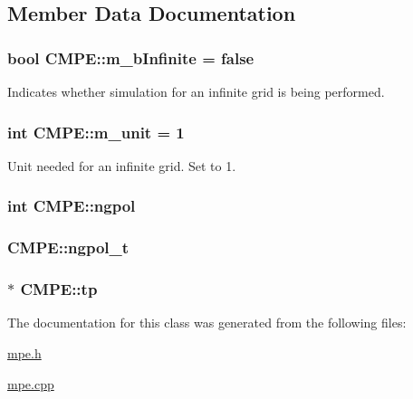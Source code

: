 \subsection{Member Data Documentation}
\hypertarget{classCMPE_a1c612f996b0be31759020f287d3ee7cc}{
\subsubsection[{m\-\_\-b\-Infinite}]{\setlength{\rightskip}{0pt plus 5cm}bool C\-M\-P\-E\-::m\-\_\-b\-Infinite = false\hspace{0.3cm}{\ttfamily [static]}}}\label{classCMPE_a1c612f996b0be31759020f287d3ee7cc}


Indicates whether simulation for an infinite grid is being performed. 

\hypertarget{classCMPE_adf1757fa41fec1996e7ca1c7fe6fc9e0}{
\subsubsection[{m\-\_\-unit}]{\setlength{\rightskip}{0pt plus 5cm}int C\-M\-P\-E\-::m\-\_\-unit = 1\hspace{0.3cm}{\ttfamily [static]}}}\label{classCMPE_adf1757fa41fec1996e7ca1c7fe6fc9e0}


Unit needed for an infinite grid. Set to 1. 

\hypertarget{classCMPE_a17b9196644f13740f99675a5a0d8ef23}{
\subsubsection[{ngpol}]{\setlength{\rightskip}{0pt plus 5cm}int C\-M\-P\-E\-::ngpol}}\label{classCMPE_a17b9196644f13740f99675a5a0d8ef23}
\hypertarget{classCMPE_afc7b0e78e954f7bb1419864a70c4d0b7}{
\subsubsection[{ngpol\-\_\-t}]{ C\-M\-P\-E\-::ngpol\-\_\-t}}\label{classCMPE_afc7b0e78e954f7bb1419864a70c4d0b7}
\hypertarget{classCMPE_a0e97f318480ca27d2a7d608379bd2d03}{
\subsubsection[{tp}]{ $\ast$ C\-M\-P\-E\-::tp\hspace{0.3cm}{\ttfamily [static]}}}\label{classCMPE_a0e97f318480ca27d2a7d608379bd2d03}


The documentation for this class was generated from the following files\-:\begin{DoxyCompactItemize}
\item 
\hyperlink{mpe_8h}{mpe.\-h}\item 
\hyperlink{mpe_8cpp}{mpe.\-cpp}\end{DoxyCompactItemize}
